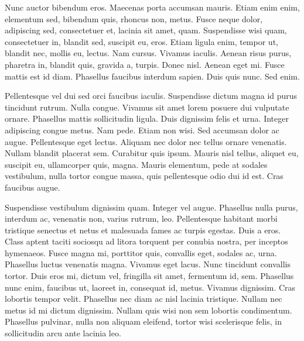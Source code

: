 Nunc auctor bibendum eros. Maecenas porta accumsan mauris. Etiam enim enim,
elementum sed, bibendum quis, rhoncus non, metus. Fusce neque dolor, adipiscing
sed, consectetuer et, lacinia sit amet, quam. Suspendisse wisi quam,
consectetuer in, blandit sed, suscipit eu, eros. Etiam ligula enim, tempor ut,
blandit nec, mollis eu, lectus. Nam cursus. Vivamus iaculis. Aenean risus
purus, pharetra in, blandit quis, gravida a, turpis. Donec nisl. Aenean eget
mi. Fusce mattis est id diam. Phasellus faucibus interdum sapien. Duis quis
nunc. Sed enim.

Pellentesque vel dui sed orci faucibus iaculis. Suspendisse dictum magna id
purus tincidunt rutrum. Nulla congue. Vivamus sit amet lorem posuere dui
vulputate ornare. Phasellus mattis sollicitudin ligula. Duis dignissim felis et
urna. Integer adipiscing congue metus. Nam pede. Etiam non wisi. Sed accumsan
dolor ac augue. Pellentesque eget lectus. Aliquam nec dolor nec tellus ornare
venenatis. Nullam blandit placerat sem. Curabitur quis ipsum. Mauris nisl
tellus, aliquet eu, suscipit eu, ullamcorper quis, magna. Mauris elementum,
pede at sodales vestibulum, nulla tortor congue massa, quis pellentesque odio
dui id est. Cras faucibus augue.

Suspendisse vestibulum dignissim quam. Integer vel augue. Phasellus nulla
purus, interdum ac, venenatis non, varius rutrum, leo. Pellentesque habitant
morbi tristique senectus et netus et malesuada fames ac turpis egestas. Duis a
eros. Class aptent taciti sociosqu ad litora torquent per conubia nostra, per
inceptos hymenaeos. Fusce magna mi, porttitor quis, convallis eget, sodales ac,
urna. Phasellus luctus venenatis magna. Vivamus eget lacus. Nunc tincidunt
convallis tortor. Duis eros mi, dictum vel, fringilla sit amet, fermentum id,
sem. Phasellus nunc enim, faucibus ut, laoreet in, consequat id, metus. Vivamus
dignissim. Cras lobortis tempor velit. Phasellus nec diam ac nisl lacinia
tristique. Nullam nec metus id mi dictum dignissim. Nullam quis wisi non sem
lobortis condimentum. Phasellus pulvinar, nulla non aliquam eleifend, tortor
wisi scelerisque felis, in sollicitudin arcu ante lacinia leo.
